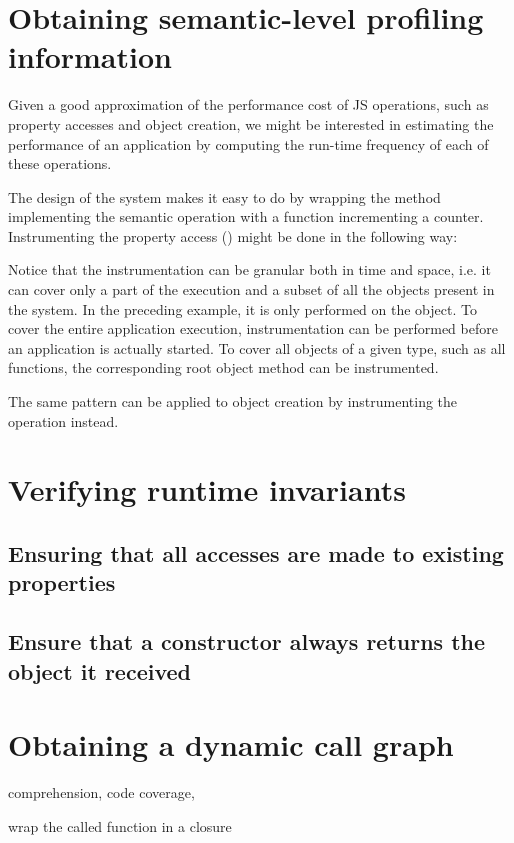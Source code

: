 \section{Obtaining semantic-level profiling information}

Given a good approximation of the performance cost of JS operations, such as
property accesses and object creation, we might be interested in estimating the
performance of an application by computing the run-time frequency of each of
these operations.

The design of the system makes it easy to do by wrapping the method
implementing the semantic operation with a function incrementing a counter.
Instrumenting the property access () might be done in the
following way:


Notice that the instrumentation can be granular both in time and space, i.e. it
can cover only a part of the execution and a subset of all the objects present
in the system. In the preceding example, it is only performed on the 
object. To cover the entire application execution, instrumentation can be performed before
an application is actually started. To cover all objects of a given type, such
as all functions, the corresponding root object method can be instrumented.

The same pattern can be applied to object creation by instrumenting the
 operation instead.


\section{Verifying runtime invariants}

\subsection{Ensuring that all accesses are made to existing properties}

\subsection{Ensure that a constructor always returns the object it received}


\section{Obtaining a dynamic call graph}

comprehension, code coverage, 






wrap the called function in a closure


